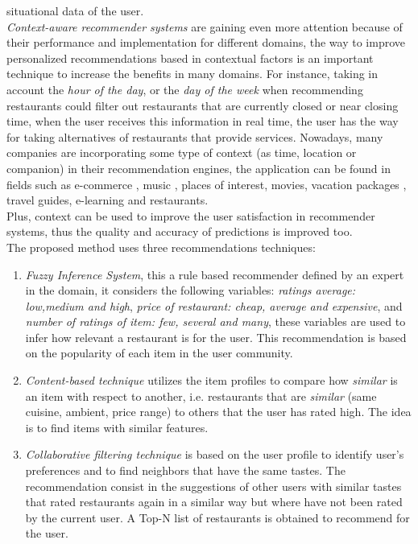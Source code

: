 situational data of the user.\\
\textit{Context-aware recommender systems} are gaining even more
attention because of their performance and implementation for
different domains, the  way to improve personalized recommendations
based in contextual factors is an important technique to increase the
benefits in  many domains. For instance, taking in account the
\textit{hour of the day},  or the \textit{day of the week} when
recommending restaurants could  filter out restaurants that are
currently closed or near closing time, when the user receives this
information in real time, the user has the  way for taking
alternatives of restaurants that provide services. Nowadays, many
companies are incorporating some type of context (as time, location or
companion) in their recommendation engines, the application can be
found in fields such as e-commerce\cite{schafer1999recommender}
\cite{bulander2005enabling}, music\cite{ricci2012context}
\cite{baltrunas2011incarmusic} \cite{huq2010automated}, places of
interest\cite{baltrunas2012context},
movies\cite{eyjolfsdottir2010moviegen}, vacation
packages\cite{liu2011personalized} \cite{liu2014cocktail},  travel
guides\cite{savage2012m}, e-learning\cite{ortigosa2010entornos}  and
restaurants\cite{chu2013chinese}.\\
Plus, context can be used to improve the user satisfaction  in
recommender systems, thus the quality and accuracy of predictions  
is improved too. \\
The proposed method uses three recommendations techniques:
\begin{enumerate} 
\item \textit{Fuzzy Inference System}, this a rule based recommender
defined by an expert in the domain, it considers the following
variables: \textit{ratings average: low,medium and high},
\textit{price of restaurant: cheap, average and expensive}, and
\textit{number of ratings of item: few, several and many}, these
variables are used to infer how relevant a restaurant is for the user.
This recommendation is based on the popularity of each item in the
user community.
\item \textit{Content-based technique} utilizes the item profiles 
to compare how \textit{similar} is an item with respect to 
another, i.e. restaurants that are \textit{similar} (same cuisine, 
ambient, price range) to others that the user has rated high. 
The idea is to find items with similar features. 
\item \textit{Collaborative filtering technique} is based on the user
profile to identify user's preferences and to find neighbors that
have the same tastes. The recommendation consist in the suggestions of
other users with similar tastes that rated restaurants again in a
similar way but where have not been rated by the current user. A Top-N
list of restaurants is obtained to recommend for the user.
\end{enumerate} 
